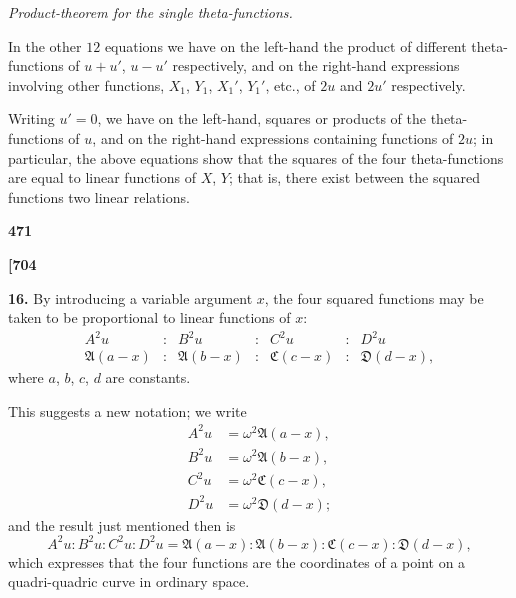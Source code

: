 \documentclass[11pt,a4paper]{book}
\begin{document}
\vspace{1em}

\textit{Product-theorem for the single theta-functions.}

\noindent In the other $12$ equations we have on the left-hand the product of different theta-functions of $u + u'$, $u - u'$ respectively, and on the right-hand expressions involving other functions, $X_1$, $Y_1$, $X_1'$, $Y_1'$, etc., of $2u$ and $2u'$ respectively.

Writing $u' = 0$, we have on the left-hand, squares or products of the theta-functions of $u$, and on the right-hand expressions containing functions of $2u$; in particular, the above equations show that the squares of the four theta-functions are equal to linear functions of $X$, $Y$; that is, there exist between the squared functions two linear relations.

\vspace{1em}

\begin{center}
\textbf{471}
\end{center}

\vspace{0.5em}

\noindent\textbf{[704}

\vspace{0.5em}

\noindent\textbf{16.}\quad
By introducing a variable argument $x$, the four squared functions may be taken to be proportional to linear functions of $x$:
\[
\begin{matrix}
A^2 u & : & B^2 u & : & C^2 u & : & D^2 u \\
\mathfrak{A}(a - x) & : & \mathfrak{A}(b - x) & : & \mathfrak{C}(c - x) & : & \mathfrak{D}(d - x),
\end{matrix}
\]
where $a$, $b$, $c$, $d$ are constants.

This suggests a new notation; we write
\begin{align*}
A^2 u &= \omega^2 \mathfrak{A}(a - x), \\
B^2 u &= \omega^2 \mathfrak{A}(b - x), \\
C^2 u &= \omega^2 \mathfrak{C}(c - x), \\
D^2 u &= \omega^2 \mathfrak{D}(d - x);
\end{align*}
and the result just mentioned then is
\[
A^2 u : B^2 u : C^2 u : D^2 u = \mathfrak{A}(a - x) : \mathfrak{A}(b - x) : \mathfrak{C}(c - x) : \mathfrak{D}(d - x),
\]
which expresses that the four functions are the coordinates of a point on a quadri-quadric curve in ordinary space.
\end{document}

